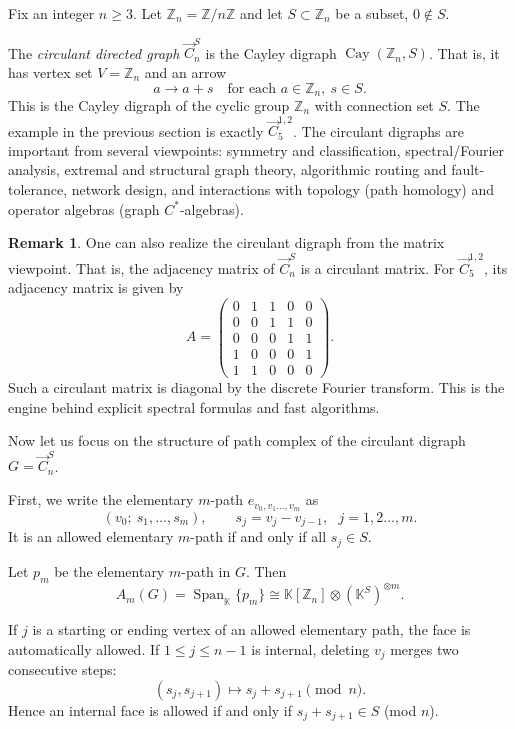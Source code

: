 \documentclass[11pt]{amsart}
\DeclareMathOperator{\Span}{Span}
\DeclareMathOperator{\Cay}{Cay}
\newcommand{\Z}{\mathbb Z}
\newcommand{\K}{\mathbb K}
\theoremstyle{plain}
\theoremstyle{definition}
\newtheorem{remark}[theorem]{Remark}
\numberwithin{equation}{section}
\begin{document}
Fix an integer $n\geq 3$.  Let $\mathbb Z_n=\mathbb Z/n\mathbb Z$ and let $S\subset\Z_n$ be a subset, $0\notin S$.

The \emph{circulant directed graph} $\vec{C}_n^S$ is the Cayley digraph 
$\Cay(\Z_n,S)$. That is, it has vertex set $V=\mathbb Z_n$ and an arrow
\[
a\longrightarrow a+s\quad\text{for each }a\in\mathbb Z_n,\ s\in S.
\]
This is the Cayley digraph of the cyclic group $\mathbb Z_n$ with connection set $S$. The example in the previous section is exactly $\vec{C}_5^{1,2}$. The circulant digraphs are important from several viewpoints: symmetry and classification, spectral/Fourier analysis, extremal and structural graph theory, algorithmic routing and fault-tolerance, network design, and interactions with topology (path homology) and operator algebras (graph $C^\ast$-algebras). 

\begin{remark}
One can also realize the circulant digraph from the matrix viewpoint. That is, the adjacency matrix of $\vec{C}_n^S$ is a circulant matrix. For $\vec{C}_5^{1,2}$, its adjacency matrix is given by
\[A=\begin{pmatrix}
    0 & 1 & 1 & 0 & 0\\
    0 & 0 & 1 & 1 & 0\\
    0 & 0 & 0 & 1 & 1\\
    1 & 0 & 0 & 0 & 1\\
    1 & 1 & 0 & 0 & 0
\end{pmatrix}.\]
Such a circulant matrix is diagonal by the discrete Fourier transform. This is the engine behind explicit spectral formulas and fast algorithms. 
\end{remark}

Now let us focus on the structure of path complex of the circulant digraph $G=\vec{C}_n^S$. 

First, we write the elementary $m$-path $e_{v_0,v_1\ldots,v_m}$ as
\begin{equation}\label{elementarypath2}
(v_0;~s_1,\ldots,s_m),\qquad s_j=v_j-v_{j-1},~~~j=1,2\ldots,m.
\end{equation}
It is an allowed elementary $m$-path if and only if all $s_j\in S$.

Let $p_m$ be the elementary $m$-path in $G$. 
Then
\[A_m(G)=\Span_{\K}\{p_m\}\cong \K[\Z_n]\otimes (\K^S)^{\otimes m}.\]

If $j$ is a starting or ending vertex of an allowed elementary path, the face is automatically allowed.
If $1\le j\le n-1$ is internal, deleting $v_j$ merges two consecutive steps:
\[
(s_j,s_{j+1}) \mapsto s_j+s_{j+1} \pmod n.
\]
Hence an internal face is allowed if and only if $s_j+s_{j+1}\in S$ (mod $n$).
\end{document}
